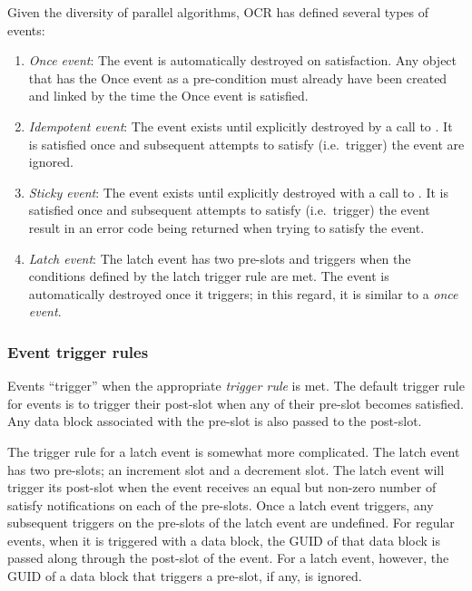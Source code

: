 Given the diversity of parallel algorithms, OCR has defined several
types of events:
\begin{enumerate}
\item \emph{Once event}: The event is automatically
destroyed on satisfaction. Any object that has the Once event as a
pre-condition must already have been created and linked by the time
the Once event is satisfied.

\item \emph{Idempotent event}: The event
exists until explicitly destroyed by a call to
. It is satisfied once and subsequent attempts
to satisfy (i.e.\ trigger) the event are ignored.

\item \emph{Sticky event}: The event exists until
explicitly destroyed with a call to . It is
satisfied once and subsequent attempts to satisfy (i.e.\ trigger) the
event result in an error code being returned when trying to satisfy
the event.

\item \emph{Latch event}: The latch event has two
pre-slots and triggers when the conditions defined by the latch
trigger rule are met. The event is automatically destroyed once it
triggers; in this regard, it is similar to a \emph{once event}.
\end{enumerate}
\subsubsection{Event trigger rules}
Events ``trigger'' when the appropriate \emph{trigger
rule} is met. The default trigger rule for events
is to trigger their post-slot when any of their pre-slot becomes
satisfied. Any data block associated with the pre-slot is also passed
to the post-slot.

The trigger rule for a latch event is somewhat more complicated. The
latch event has two pre-slots; an increment slot and a decrement
slot. The latch event will trigger its post-slot when the event
receives an equal but non-zero number of satisfy notifications on each
of the pre-slots. Once a latch event triggers, any subsequent
triggers on the pre-slots of the latch event are undefined. For
regular events, when it is triggered with a data block, the GUID of
that data block is passed along through the post-slot of the
event. For a latch event, however, the GUID of a data block that
triggers a pre-slot, if any, is ignored.

